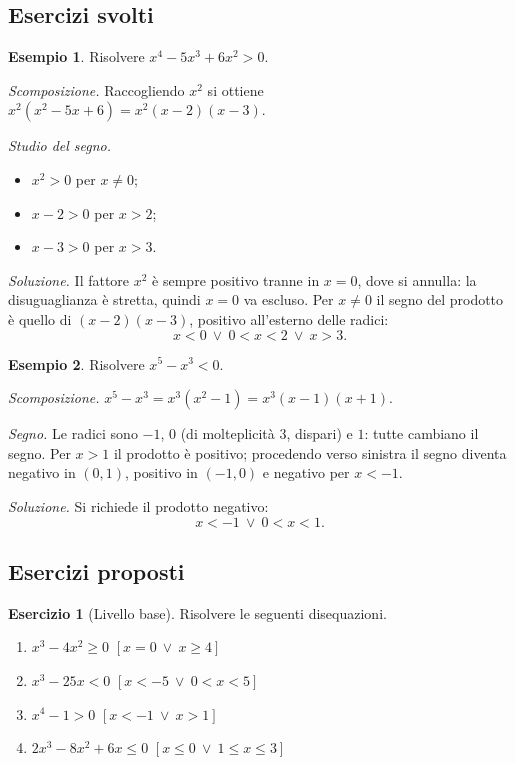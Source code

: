 \documentclass[12pt,a4paper,openany]{book}
\theoremstyle{definition}
\newtheorem{esempio}{Esempio}[section]
\newtheorem{esercizio}{Esercizio}[section]
\theoremstyle{plain}
\theoremstyle{remark}
\begin{document}
\subsection*{Esercizi svolti}

\begin{esempio}
Risolvere $x^4-5x^3+6x^2>0$.

\emph{Scomposizione.} Raccogliendo $x^2$ si ottiene $x^2(x^2-5x+6)=x^2(x-2)(x-3)$.

\emph{Studio del segno.}
\begin{itemize}
\item $x^2>0$ per $x\neq 0$;
\item $x-2>0$ per $x>2$;
\item $x-3>0$ per $x>3$.
\end{itemize}

\emph{Soluzione.} Il fattore $x^2$ è sempre positivo tranne in $x=0$, dove si annulla: la disuguaglianza è stretta, quindi $x=0$ va escluso. Per $x\neq 0$ il segno del prodotto è quello di $(x-2)(x-3)$, positivo all'esterno delle radici:
\[
x<0\ \lor\ 0<x<2\ \lor\ x>3.
\]
\end{esempio}

\begin{esempio}
Risolvere $x^5-x^3<0$.

\emph{Scomposizione.} $x^5-x^3=x^3(x^2-1)=x^3(x-1)(x+1)$.

\emph{Segno.} Le radici sono $-1$, $0$ (di molteplicità $3$, dispari) e $1$: tutte cambiano il segno. Per $x>1$ il prodotto è positivo; procedendo verso sinistra il segno diventa negativo in $(0,1)$, positivo in $(-1,0)$ e negativo per $x<-1$.

\emph{Soluzione.} Si richiede il prodotto negativo:
\[
x<-1\ \lor\ 0<x<1.
\]
\end{esempio}

\subsection*{Esercizi proposti}

\begin{esercizio}[Livello base]
Risolvere le seguenti disequazioni.
\begin{enumerate}[label=\alph*)]
\item $x^3-4x^2\ge 0$ \hfill $[x=0\ \lor\ x\ge 4]$
\item $x^3-25x<0$ \hfill $[x<-5\ \lor\ 0<x<5]$
\item $x^4-1>0$ \hfill $[x<-1\ \lor\ x>1]$
\item $2x^3-8x^2+6x\le 0$ \hfill $[x\le 0\ \lor\ 1\le x\le 3]$
\end{enumerate}
\end{esercizio}
\end{document}

